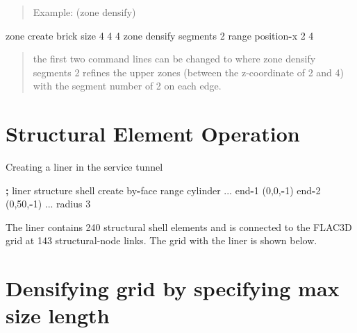 \documentclass[a4paper, nobind]{templates/ociamthesis}
\newenvironment{Shaded}{\begin{snugshade}}{\end{snugshade}}
\newcommand{\BuiltInTok}[1]{#1}
\newcommand{\DecValTok}[1]{\textcolor[rgb]{0.00,0.00,0.81}{#1}}
\newcommand{\NormalTok}[1]{#1}
\newcommand{\OperatorTok}[1]{\textcolor[rgb]{0.81,0.36,0.00}{\textbf{#1}}}
\renewenvironment{Shaded}
{
  \vspace{10pt}%
  \begin{snugshade}%
}{%
  \end{snugshade}%
  \vspace{8pt}%
}
\begin{document}
\begin{quote}
Example: (zone densify)
\end{quote}

\begin{Shaded}
\begin{Highlighting}[]
\NormalTok{zone create brick size }\DecValTok{4} \DecValTok{4} \DecValTok{4}
\NormalTok{zone densify segments }\DecValTok{2} \BuiltInTok{range}\NormalTok{ position}\OperatorTok{{-}}\NormalTok{x }\DecValTok{2} \DecValTok{4}
\end{Highlighting}
\end{Shaded}

\begin{quote}
the first two command lines can be changed to where zone densify
segments 2 refines the upper zones (between the z-coordinate of 2 and 4) with the segment number of 2 on each edge.
\end{quote}

\hypertarget{structural-element-operation}{%
\section{Structural Element Operation}\label{structural-element-operation}}

Creating a liner in the service tunnel

\begin{Shaded}
\begin{Highlighting}[]
\OperatorTok{;}\NormalTok{ liner}
\NormalTok{structure shell create by}\OperatorTok{{-}}\NormalTok{face }\BuiltInTok{range}\NormalTok{ cylinder ...}
\NormalTok{                                     end}\OperatorTok{{-}}\DecValTok{1}\NormalTok{ (}\DecValTok{0}\NormalTok{,}\DecValTok{0}\NormalTok{,}\OperatorTok{{-}}\DecValTok{1}\NormalTok{) end}\OperatorTok{{-}}\DecValTok{2}\NormalTok{ (}\DecValTok{0}\NormalTok{,}\DecValTok{50}\NormalTok{,}\OperatorTok{{-}}\DecValTok{1}\NormalTok{) ...}
\NormalTok{                                     radius }\DecValTok{3}
\end{Highlighting}
\end{Shaded}

The liner contains 240 structural shell elements and is connected to the FLAC3D grid at 143 structural-node links. The grid with the liner is shown below.

\hypertarget{densifying-grid-by-specifying-max-size-length}{%
\section{Densifying grid by specifying max size length}\label{densifying-grid-by-specifying-max-size-length}}
\end{document}
